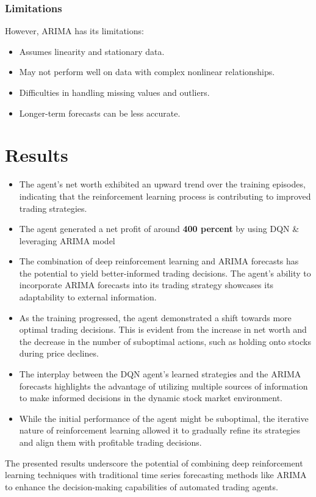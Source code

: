\documentclass{article}
\begin{document}
\subsubsection{Limitations}
However, ARIMA has its limitations:

\begin{itemize}
    \item Assumes linearity and stationary data.
    \item May not perform well on data with complex nonlinear relationships.
    \item Difficulties in handling missing values and outliers.
    \item Longer-term forecasts can be less accurate.
\end{itemize}

\section{Results }


\begin{itemize}
    \item The agent's net worth exhibited an upward trend over the training episodes, indicating that the reinforcement learning process is contributing to improved trading strategies.

    \item The agent generated a net profit of around \textbf{400 percent}  by using DQN & leveraging ARIMA model 
    
    \item The combination of deep reinforcement learning and ARIMA forecasts has the potential to yield better-informed trading decisions. The agent's ability to incorporate ARIMA forecasts into its trading strategy showcases its adaptability to external information.
    
    \item As the training progressed, the agent demonstrated a shift towards more optimal trading decisions. This is evident from the increase in net worth and the decrease in the number of suboptimal actions, such as holding onto stocks during price declines.
    
    \item The interplay between the DQN agent's learned strategies and the ARIMA forecasts highlights the advantage of utilizing multiple sources of information to make informed decisions in the dynamic stock market environment.
    
    \item While the initial performance of the agent might be suboptimal, the iterative nature of reinforcement learning allowed it to gradually refine its strategies and align them with profitable trading decisions.
\end{itemize}

The presented results underscore the potential of combining deep reinforcement learning techniques with traditional time series forecasting methods like ARIMA to enhance the decision-making capabilities of automated trading agents.
\end{document}
